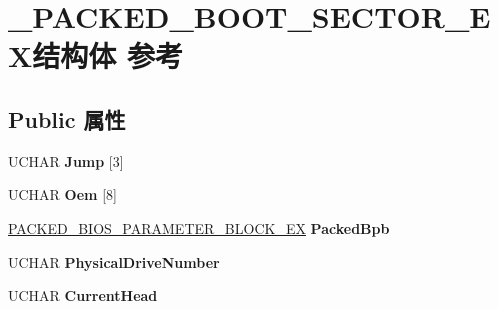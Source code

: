 \hypertarget{struct___p_a_c_k_e_d___b_o_o_t___s_e_c_t_o_r___e_x}{}\section{\+\_\+\+P\+A\+C\+K\+E\+D\+\_\+\+B\+O\+O\+T\+\_\+\+S\+E\+C\+T\+O\+R\+\_\+\+E\+X结构体 参考}
\label{struct___p_a_c_k_e_d___b_o_o_t___s_e_c_t_o_r___e_x}
\subsection*{Public 属性}
\begin{DoxyCompactItemize}
\item 
\mbox{\label{struct___p_a_c_k_e_d___b_o_o_t___s_e_c_t_o_r___e_x_a7fc27eafab00d3eaca64dbe580331a8a}} 
U\+C\+H\+AR {\bfseries Jump} \mbox{[}3\mbox{]}
\item 
\mbox{\label{struct___p_a_c_k_e_d___b_o_o_t___s_e_c_t_o_r___e_x_af4551d7f1a75ce36ab46e185ad0e9859}} 
U\+C\+H\+AR {\bfseries Oem} \mbox{[}8\mbox{]}
\item 
\mbox{\label{struct___p_a_c_k_e_d___b_o_o_t___s_e_c_t_o_r___e_x_abeb67ceab485f0a34e21952ecda1fb2d}} 
\hyperlink{struct___p_a_c_k_e_d___b_i_o_s___p_a_r_a_m_e_t_e_r___b_l_o_c_k___e_x}{P\+A\+C\+K\+E\+D\+\_\+\+B\+I\+O\+S\+\_\+\+P\+A\+R\+A\+M\+E\+T\+E\+R\+\_\+\+B\+L\+O\+C\+K\+\_\+\+EX} {\bfseries Packed\+Bpb}
\item 
\mbox{\label{struct___p_a_c_k_e_d___b_o_o_t___s_e_c_t_o_r___e_x_aa9a0b36dae17381a5d57a98663833725}} 
U\+C\+H\+AR {\bfseries Physical\+Drive\+Number}
\item 
\mbox{\label{struct___p_a_c_k_e_d___b_o_o_t___s_e_c_t_o_r___e_x_a3a5e9a517dab201009b528b507d5ccfd}} 
U\+C\+H\+AR {\bfseries Current\+Head}
\item 
\mbox{\label{struct___p_a_c_k_e_d___b_o_o_t___s_e_c_t_o_r___e_x_a3a2c8d8ff4d9c0f3f98d4146db463028}} 

\end{DoxyCompactItemize}
